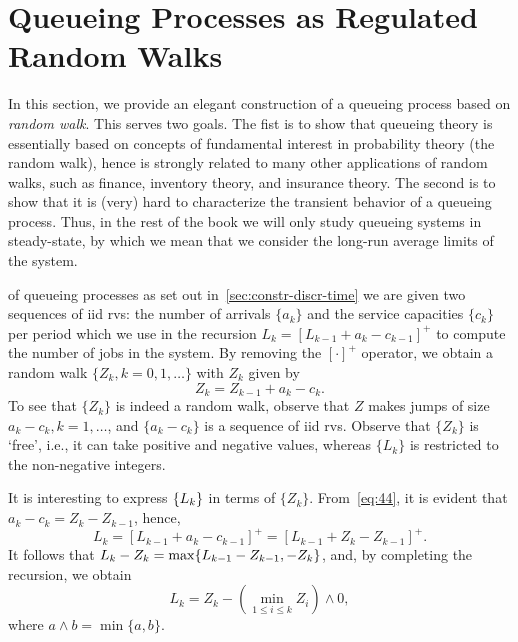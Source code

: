 

\section{Queueing Processes as Regulated Random Walks}
\label{sec:queu-proc-as}


In this section, we provide an elegant construction of a queueing process based on  \emph{random walk}.
This serves two goals.
The fist is to show that queueing theory is essentially based on concepts of fundamental interest in probability theory (the random walk), hence is strongly related to many other applications of random walks, such as finance, inventory theory, and insurance theory.
The second is to show that it is (very) hard to characterize the transient behavior of a queueing process.
Thus, in the rest of the book we will only study queueing systems in steady-state, by which we mean that we consider the long-run average limits of the system.




 of queueing processes as set out in~\cref{sec:constr-discr-time} we are given two sequences of iid rvs: the number of arrivals $\{a_k\}$  and the service capacities $\{c_k\}$ per period  which we use  in the recursion $L_k = [L_{k-1} +a_k- c_{k-1}]^+$ to
compute the number of jobs in the system.
By removing the $[\cdot]^{+}$ operator, we obtain a random walk $\{Z_k, k=0,1,\ldots\}$ with $Z_k$ given by
\begin{equation}\label{eq:44}
 Z_k = Z_{k-1} + a_k - c_k.
\end{equation}
To see that $\{Z_k\}$ is indeed a random walk, observe that $Z$ makes jumps of size $a_k-c_k, k=1,\ldots$, and $\{a_k-c_k\}$ is a sequence of iid rvs. Observe that $\{Z_k\}$ is `free', i.e., it can take positive and negative values, whereas $\{L_{k}\}$ is restricted to the non-negative integers.

It is interesting to express $\{L_k\}$ in terms of $\{Z_k\}$. From~\cref{eq:44}, it is evident that $a_k - c_k = Z_k - Z_{k-1}$, hence,
\begin{equation*}
 L_k = [L_{k-1} +a_k- c_{k-1}]^+ = [L_{k-1} +Z_k- Z_{k-1}]^+.
\end{equation*}
It follows that  $L_k - Z_{k} = \max\{L_{k-1} - Z_{k-1}, -Z_k\}$,
and, by completing the recursion, we obtain
\begin{equation}\label{eq:reich1}
 L_k = Z_k - \left(\min_{1\leq i \leq k} Z_i\right)\wedge 0,
\end{equation}
where $a\wedge b = \min\{a,b\}$.

